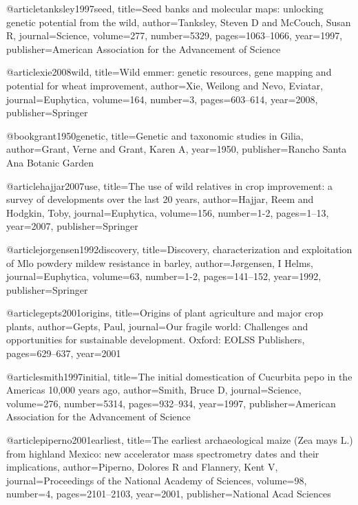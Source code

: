 @article{tanksley1997seed,
  title={Seed banks and molecular maps: unlocking genetic potential from the wild},
  author={Tanksley, Steven D and McCouch, Susan R},
  journal={Science},
  volume={277},
  number={5329},
  pages={1063--1066},
  year={1997},
  publisher={American Association for the Advancement of Science}
}

@article{xie2008wild,
  title={Wild emmer: genetic resources, gene mapping and potential for wheat improvement},
  author={Xie, Weilong and Nevo, Eviatar},
  journal={Euphytica},
  volume={164},
  number={3},
  pages={603--614},
  year={2008},
  publisher={Springer}
}

@book{grant1950genetic,
  title={Genetic and taxonomic studies in Gilia},
  author={Grant, Verne and Grant, Karen A},
  year={1950},
  publisher={Rancho Santa Ana Botanic Garden}
}

@article{hajjar2007use,
  title={The use of wild relatives in crop improvement: a survey of developments over the last 20 years},
  author={Hajjar, Reem and Hodgkin, Toby},
  journal={Euphytica},
  volume={156},
  number={1-2},
  pages={1--13},
  year={2007},
  publisher={Springer}
}

@article{jorgensen1992discovery,
  title={Discovery, characterization and exploitation of Mlo powdery mildew resistance in barley},
  author={J{\o}rgensen, I Helms},
  journal={Euphytica},
  volume={63},
  number={1-2},
  pages={141--152},
  year={1992},
  publisher={Springer}
}

@article{gepts2001origins,
  title={Origins of plant agriculture and major crop plants},
  author={Gepts, Paul},
  journal={Our fragile world: Challenges and opportunities for sustainable development. Oxford: EOLSS Publishers},
  pages={629--637},
  year={2001}
}

@article{smith1997initial,
  title={The initial domestication of Cucurbita pepo in the Americas 10,000 years ago},
  author={Smith, Bruce D},
  journal={Science},
  volume={276},
  number={5314},
  pages={932--934},
  year={1997},
  publisher={American Association for the Advancement of Science}
}

@article{piperno2001earliest,
  title={The earliest archaeological maize (Zea mays L.) from highland Mexico: new accelerator mass spectrometry dates and their implications},
  author={Piperno, Dolores R and Flannery, Kent V},
  journal={Proceedings of the National Academy of Sciences},
  volume={98},
  number={4},
  pages={2101--2103},
  year={2001},
  publisher={National Acad Sciences}
}

